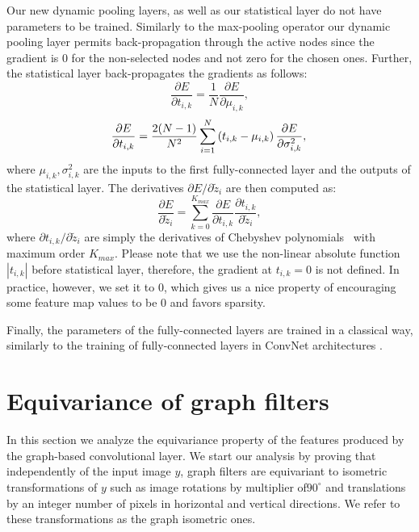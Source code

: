 \documentclass[10pt,journal,compsoc]{IEEEtran}
\begin{document}
	Our new dynamic pooling layers, as well as our statistical layer do not have parameters to be trained. Similarly to the max-pooling operator our dynamic pooling layer  permits back-propagation through the active nodes since the gradient is 0 for the non-selected nodes and not zero for the chosen ones.
	Further, the statistical layer back-propagates the gradients as follows:
	\begin{equation}
	\frac{\partial{E}} {\partial t_{i, k}}  =\frac{1}{N} \frac{\partial{E}}{\partial \mu_{i,k}},
	\label{eq:der_stat1}
	\end{equation}
	\begin{equation}
	\frac{\partial{E}} {\partial t_{i, k}}  = \frac{2 (N-1)}{N^2} \sum_{i=1}^N \left( t_{i, k} - \mu_{i,k} \right) \frac{\partial E}{\partial \sigma^2_{i, k}},\\
	\label{eq:der_stat2}
	\end{equation}
	\noindent
	where $\mu_{i,k}, \sigma^2_{i,k}$ are the inputs to the first fully-connected layer and the outputs of the statistical layer. The derivatives $\partial E / \partial \tilde{z}_i$ are then computed as:
	\begin{equation}
	\frac{\partial E}{\partial \tilde{z}_i} = \sum_{k=0}^{K_{max}}\frac{\partial E}{\partial t_{i,k}} \frac{\partial t_{i,k}}{\partial \tilde{z}_i},
	\end{equation}
	\noindent
	where $\partial t_{i,k} / \partial \tilde{z}_i$ are simply the derivatives of Chebyshev polynomials~\cite{bb:shuman2011chebyshev} with maximum order $K_{max}$. Please note that we use the non-linear absolute function $|t_{i,k}|$ before statistical layer, therefore, the gradient at $t_{i,k}=0$ is not defined. In practice, however, we set it to $0$, which gives us a nice property of encouraging some  feature map values to be $0$ and favors sparsity.

	Finally, the parameters of the fully-connected layers are trained in a classical way, similarly to the training of fully-connected layers in ConvNet architectures \cite{bb:rumelhart1988learning}. %

	\section{Equivariance of graph filters}
	\label{s:equivaricance}

	In this section we analyze the equivariance property of the features produced by the graph-based convolutional layer. We start our analysis by proving that independently of the input image $y$, graph filters are equivariant to isometric transformations of $y$ such as image rotations by multiplier of$90^\circ$ and translations by an integer number of pixels in horizontal and vertical directions. We refer to these transformations as the graph isometric ones.
\end{document}
